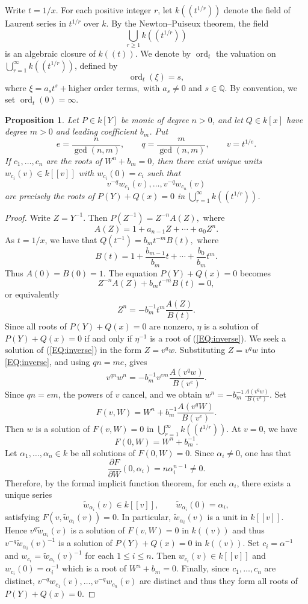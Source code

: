 \documentclass{article}
\newtheorem{proposition}[theorem]{Proposition}
\DeclareMathOperator{\ord}{ord}
\begin{document}
Write $t=1/x$. For each positive integer $r$, let $k((t^{1/r}))$ denote the field of Laurent series in $t^{1/r}$ 
over $k$. By the Newton--Puiseux theorem, the field
\[
  \bigcup_{r\geq 1} k((t^{1/r}))
\]
is an algebraic closure of $k((t))$.
We denote by $\ord_t$ the valuation on $\bigcup_{r=1}^\infty k((t^{1/r}))$, defined by
$$
\ord_t(\xi)=s,
$$
where
$
\xi=a_s t^s+\text{higher order terms},
$
with $a_s\neq 0$ and $s\in\mathbb{Q}$. By convention, we set $\ord_t(0)=\infty$.  
\begin{proposition}
\label{PROP:Puiseuxsolutions}
Let $P\in k[Y]$ be monic of degree $n>0$, and let $Q\in k[x]$ have degree $m>0$ and leading coefficient $b_m$. Put
\[
  e=\frac{n}{\gcd(n,m)},\qquad q=\frac{m}{\gcd(n,m)},\qquad v=t^{1/e}.
\]
If $c_1,\dots,c_n$ are the roots of $W^n+b_m=0$, then there exist unique units $w_{c_i}(v)\in k[[v]]$ with $w_{c_i}(0)=c_i$ such that
\[
  v^{-q}w_{c_1}(v),\dots,v^{-q}w_{c_n}(v)
\]
are precisely the roots of $P(Y)+Q(x)=0$ in $\bigcup_{r=1}^\infty k((t^{1/r}))$.
\end{proposition}
\begin{proof}
Write $Z=Y^{-1}$.  Then
$
P(Z^{-1})=Z^{-n}A(Z),
$
where
$$
A(Z)=1+a_{n-1}Z+\cdots+a_0Z^n.
$$
As $t=1/x$, we have that 
$
Q(t^{-1})=b_mt^{-m}B(t),
$ 
where
$$
B(t)=1+\frac{b_{m-1}}{b_m}t+\cdots+\frac{b_0}{b_m}t^m.
$$
Thus \(A(0)=B(0)=1\). The equation
$
P(Y)+Q(x)=0
$
becomes
\[
Z^{-n}A(Z)+b_mt^{-m}B(t)=0,
\]
or equivalently
\begin{equation}\label{EQ:inverse}
 Z^n=-b_m^{-1}t^m\frac{A(Z)}{B(t)}.
\end{equation}
Since all roots of $P(Y)+Q(x)=0$ are nonzero, $\eta$ is a solution of $P(Y)+Q(x)=0$ if and only 
if $\eta^{-1}$ is a root of (\ref{EQ:inverse}).
We seek a solution of (\ref{EQ:inverse}) in the form $Z=v^qw$. 
Substituting $Z=v^qw$ into \eqref{EQ:inverse}, and using
\(qn=me\), gives
\[
v^{qn}w^n
 =-b_m^{-1}v^{em}\frac{A(v^qw)}{B(v^e)}.
\]
Since \(qn=em\), the powers of \(v\) cancel, and we obtain
$
 w^n=-b_m^{-1}\frac{A(v^qw)}{B(v^e)}.
$
Set
\[
F(v,W)
 =W^n+b_m^{-1}\frac{A(v^qW)}{B(v^e)}.
\]
Then $w$ is a solution of $F(v,W)=0$ in $\bigcup_{r=1}^\infty k((t^{1/r}))$. At \(v=0\), we have
\[
F(0,W)=W^n+b_m^{-1}.
\]
Let $\alpha_1,\dots,\alpha_n\in k$ be all solutions of $F(0, W)=0$. Since $\alpha_i\neq 0$, one has that
\[
\frac{\partial F}{\partial W}(0,\alpha_i)=n\alpha_i^{n-1}\neq 0. 
\]
Therefore, by the formal implicit function theorem, for each $\alpha_i$, there exists a unique series
\[
\tilde{w}_{\alpha_i}(v)\in k[[v]],
\qquad \tilde{w}_{\alpha_i}(0)=\alpha_i,
\]
satisfying $F(v, \tilde{w}_{\alpha_i}(v))=0$. In particular, $\tilde{w}_{\alpha_i}(v)$ is a unit in
$k[[v]]$. Hence
$
v^q\tilde{w}_{\alpha_i}(v)
$
is a solution of $F(v,W)=0$ in $k((v))$ and thus $v^{-q}\tilde{w}_{\alpha_i}(v)^{-1}$ is a solution of $P(Y)+Q(x)=0$ in $k((v))$. Set $c_i=\alpha^{-1}$ and $w_{c_i}=\tilde{w}_{\alpha_i}(v)^{-1}$ for each $1\leq i \leq n$. Then $w_{c_i}(v)\in k[[v]]$ and $w_{c_i}(0)=\alpha_i^{-1}$ which is a root of $W^n+b_m=0$.  
Finally, since $c_1,\dots,c_n$ are distinct, $v^{-q}w_{c_1}(v),\dots, v^{-q}w_{c_n}(v)$ are distinct and thus they form all roots of $P(Y)+Q(x)=0$.
\end{proof}
\end{document}
